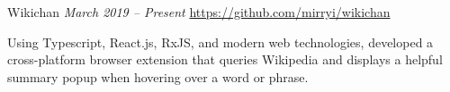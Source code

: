 \documentclass[letterpaper,11pt]{article}
\begin{document}
  \begin{rsectionlist}
    \rsectionitem
      {Wikichan}
      {\small\itshape March 2019 -- Present}
      {\small \url{https://github.com/mirryi/wikichan}}
      {}

      Using Typescript, React.js, RxJS, and modern web technologies, developed a cross-platform
      browser extension that queries Wikipedia and displays a helpful summary popup when hovering
      over a word or phrase.


  \end{rsectionlist}
\end{document}

